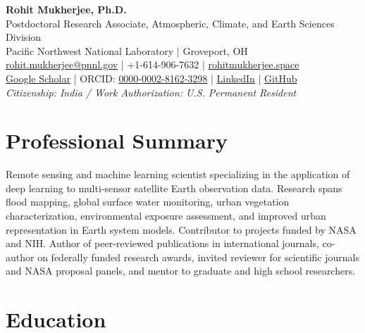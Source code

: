 \documentclass[10pt,letterpaper]{article}
\begin{document}
\begin{center}
  {\LARGE \textbf{Rohit Mukherjee, Ph.D.}}\\[2pt]
  \small
  Postdoctoral Research Associate, Atmospheric, Climate, and Earth Sciences Division\\
  Pacific Northwest National Laboratory \;|\; Groveport, OH\\[2pt]
  \href{mailto:rohit.mukherjee@pnnl.gov}{rohit.mukherjee@pnnl.gov}
  \;|\; +1-614-906-7632
  \;|\; \href{https://rohitmukherjee.space/}{rohitmukherjee.space}\\
  \href{https://scholar.google.com/citations?user=FBk18BwAAAAJ&hl=en}{Google Scholar}
  \;|\; ORCID: \href{https://orcid.org/0000-0002-8162-3298}{0000-0002-8162-3298}
  \;|\; \href{https://www.linkedin.com/in/rohitmukherjee/}{LinkedIn}
  \;|\; \href{https://github.com/Rohit18}{GitHub}\\
  \emph{Citizenship: India \;/\; Work Authorization: U.S. Permanent Resident}
\end{center}

\section*{Professional Summary}

Remote sensing and machine learning scientist specializing in the application of deep learning to multi-sensor satellite Earth observation data. Research spans flood mapping, global surface water monitoring, urban vegetation characterization, environmental exposure assessment, and improved urban representation in Earth system models. Contributor to projects funded by NASA and NIH. Author of peer-reviewed publications in international journals, co-author on federally funded research awards, invited reviewer for scientific journals and NASA proposal panels, and mentor to graduate and high school researchers.

\section*{Education}
\end{document}
